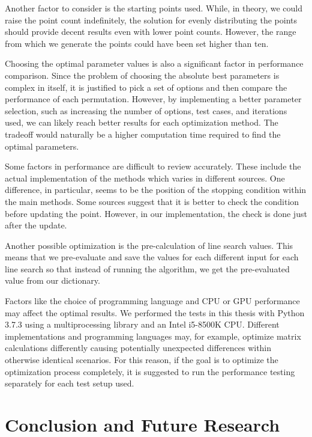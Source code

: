 \documentclass[a4paper,english,titlepage,12pt]{article}
\begin{document}
Another factor to consider is the starting points used. While, in theory, we could raise the point count indefinitely, the solution for evenly distributing the points should provide decent results even with lower point counts. However, the range from which we generate the points could have been set higher than ten.

Choosing the optimal parameter values is also a significant factor in performance comparison. Since the problem of choosing the absolute best parameters is complex in itself, it is justified to pick a set of options and then compare the performance of each permutation. However, by implementing a better parameter selection, such as increasing the number of options, test cases, and iterations used, we can likely reach better results for each optimization method. The tradeoff would naturally be a higher computation time required to find the optimal parameters.

Some factors in performance are difficult to review accurately. These include the actual implementation of the methods which varies in different sources. One difference, in particular, seems to be the position of the stopping condition within the main methods. Some sources suggest that it is better to check the condition before updating the point. However, in our implementation, the check is done just after the update. \cite{book:convex_optimization} \cite{book:nonlinear_programming}

Another possible optimization is the pre-calculation of line search values. This means that we pre-evaluate and save the values for each different input for each line search so that instead of running the algorithm, we get the pre-evaluated value from our dictionary. \cite{book:convex_optimization}

Factors like the choice of programming language and CPU or GPU performance may affect the optimal results. We performed the tests in this thesis with Python 3.7.3 using a multiprocessing library and an Intel i5-8500K CPU. Different implementations and programming languages may, for example, optimize matrix calculations differently causing potentially unexpected differences within otherwise identical scenarios. For this reason, if the goal is to optimize the optimization process completely, it is suggested to run the performance testing separately for each test setup used.


\section{Conclusion and Future Research}
\end{document}

